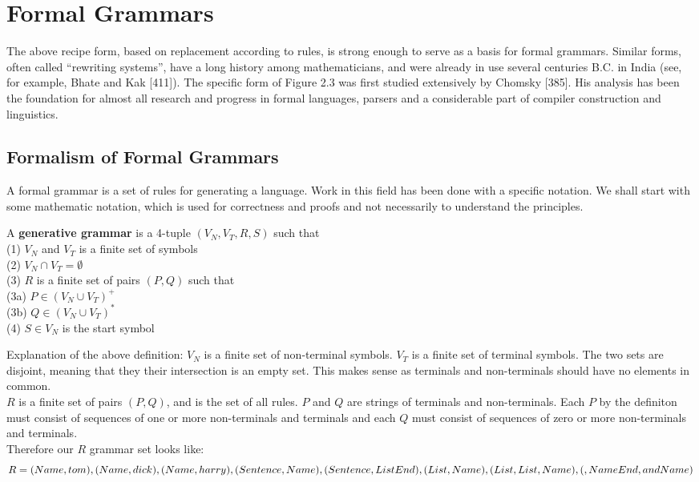 \section{Formal Grammars}
The above recipe form, based on replacement according to rules, is strong enough
to serve as a basis for formal grammars. Similar forms, often called “rewriting systems”, have a long history among mathematicians, and were already in use several
centuries B.C. in India (see, for example, Bhate and Kak [411]). The specific form
of Figure 2.3 was first studied extensively by Chomsky [385]. His analysis has been
the foundation for almost all research and progress in formal languages, parsers and
a considerable part of compiler construction and linguistics.

\subsection{Formalism of Formal Grammars}
A formal grammar is a set of rules for generating a language. Work in this field has been done with a specific notation. 
We shall start with some mathematic notation, which is used for correctness and proofs and not necessarily to understand the principles.

\begin{definition}
    A \textbf{generative grammar} is a 4-tuple $(V_N, V_T, R, S)$ such that \\
    (1) $V_N$ and $V_T$ is a finite set of symbols \\ 
    (2) $V_N \cap V_T = \emptyset$ \\
    (3) $R$ is a finite set of pairs $(P,Q)$ such that \\
        (3a) $P \in (V_N \cup V_T)^+$ \\
        (3b) $Q \in (V_N \cup V_T)^*$ \\
    (4) $S \in V_N$ is the start symbol
\end{definition}

Explanation of the above definition: 
$V_N$ is a finite set of non-terminal symbols. $V_T$ is a finite set of terminal symbols. The two sets are disjoint, meaning that they their intersection is an empty set.
This makes sense as terminals and non-terminals should have no elements in common. \\
$R$ is a finite set of pairs $(P,Q)$, and is the set of all rules. $P$ and $Q$ are strings of terminals and non-terminals. Each $P$ by the definiton  must consist of sequences of one or more non-terminals
and terminals and each $Q$ must consist of sequences of zero or more non-terminals and terminals.  \\
Therefore our $R$ grammar set looks like: 
$$R = {(Name, tom), (Name, dick), (Name, harry), \\
(Sentence, Name), (Sentence, List End), (List, Name), \\
(List, List , Name), (, Name End, and Name)}$$

